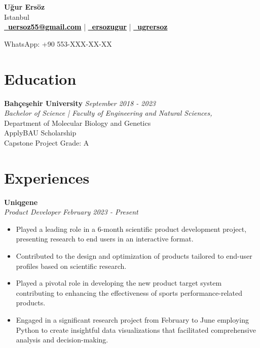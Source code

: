 \documentclass[a4paper,10pt]{article}
\newcommand{\sepspace}{\noindent\makebox[\linewidth]{\rule{\textwidth}{0.4pt}}}
\begin{document}
\begin{center}
    {\LARGE \textbf{Uğur Ersöz}}\\
    \vspace{0.3cm}
    Istanbul\\
    \vspace{0.3cm}
    \textbf{\href{mailto:uersoz55@gmail.com}{\textcolor{black}{\faEnvelope \ uersoz55@gmail.com}}} \hspace{0.2cm} | 
    \textbf{\href{https://www.linkedin.com/in/ersozugur}{\textcolor{black}{\faLinkedin \ ersozugur}}} \hspace{0.2cm} | 
    \textbf{\href{https://github.com/ugrersoz}{\textcolor{black}{\faGithub \ ugrersoz}}} \\
\end{center}

\begin{center}
    \vspace{0.3cm}
    WhatsApp: +90 553-XXX-XX-XX \hspace{0.3cm} 
\end{center}



\sepspace


\section*{Education}
\noindent\textbf{Bahçeşehir University} \hfill \textit{September 2018 - 2023} \\
\textit{Bachelor of Science | Faculty of Engineering and Natural Sciences,} \\
       {Department of Molecular Biology and Genetics}
\vspace{0.3cm}
\\  
ApplyBAU Scholarship \\
Capstone Project Grade: A

\sepspace

\section*{Experiences}
\noindent\textbf{Uniqgene} \\
\textit{Product Developer} \hfill \textit{February 2023 - Present} \\
\begin{itemize}[noitemsep]
    \item Played a leading role in a 6-month scientific product development project, presenting research to end users in an interactive format.
    \item Contributed to the design and optimization of products tailored to end-user profiles based on scientific research.
    \item Played a pivotal role in developing the new product target system contributing to enhancing the effectiveness of sports performance-related products.
    \item Engaged in a significant research project from February to June employing Python to create insightful data visualizations that facilitated comprehensive analysis and decision-making.
\end{itemize}
\end{document}
